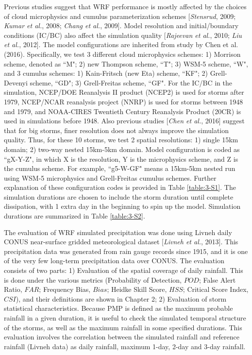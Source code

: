 Previous studies suggest that WRF performance is mostly affected by the choices of cloud microphysics and cumulus parameterization schemes [\textit{Stensrud}, 2009; \textit{Kumar et al.}, 2008; \textit{Chang et al.}, 2009]. Model resolution and initial/boundary conditions (IC/BC) also affect the simulation quality [\textit{Rajeevan et al.}, 2010; \textit{Liu et al.}, 2012]. The model configurations are inherited from study by Chen et al. (2016). Specifically, we test 3 different cloud microphysics schemes: 1) Morrison scheme, denoted as ``M"; 2) new Thompson scheme, ``T"; 3) WSM-5 scheme, ``W", and 3 cumulus schemes: 1) Kain-Fritsch (new Eta) scheme, ``KF"; 2) Grell-Devenyi scheme, ``GD"; 3) Grell-Freitas scheme, ``GF". For the IC/BC in the simulation, NCEP/DOE Reanalysis II product (NCEP2) is used for storms after 1979, NCEP/NCAR reanalysis project (NNRP) is used for storms between 1948 and 1979, and NOAA-CIRES Twentieth Century Reanalysis Product (20CR) is used in simulations before 1948. Also previous studies [\textit{Chen et al.}, 2016] suggest that for big storms, finer resolution does not always improve the simulation quality. Thus, for these 10 storms, we test 2 spatial resolutions: 1) single 15km domain; 2) two-way nested 15km-5km domain. Model configuration is coded as ``gX-Y-Z", in which X is the resolution, Y is the microphysics scheme, and Z is the cumulus scheme. For example, ``g5-W-GF" means a 15km-5km nested run using WSM-5 microphysics and Grell-Freitas cumulus schemes. Further explanation of these configuration codes is provided in Table \ref{table:3-S1}. The simulation durations are chosen to include the storm duration until complete dissipation, with 1 extra day in the beginning to spin up the model. Simulation durations are summarized in Table \ref{table:3-S2}.

The evaluation of WRF simulated precipitation was done using Livneh daily CONUS near-surface gridded meteorological dataset [\textit{Livneh et al.}, 2013]. This precipitation data was generated from rain gauge records since 1915, and it is one of the very few long-term precipitation data over CONUS. The evaluation consists of two parts: 1) Evaluation of the spatial coverage of daily rainfall. This is done under the various metrics (Probability of Detection, $POD$; False Alert Ratio, $FAR$; Frequency Bias, $Bias$; Heidke Skill Score, $HSS$; Critical Score Index, $CSI$), and their definitions are shown in Chapter 2; 2) Evaluation of storm statistical characteristics. Because PMP is defined as the maximum probable rainfall in a given duration, it is useful to check the simulated temporal structure of the storms, as well as the maximum rainfall in some specified durations. This evaluation involves the correlation between the simulated rainfall and reference rainfall (Livneh data) as daily rainfall, maximum 1-day, 2-day and 3-day rainfall.


